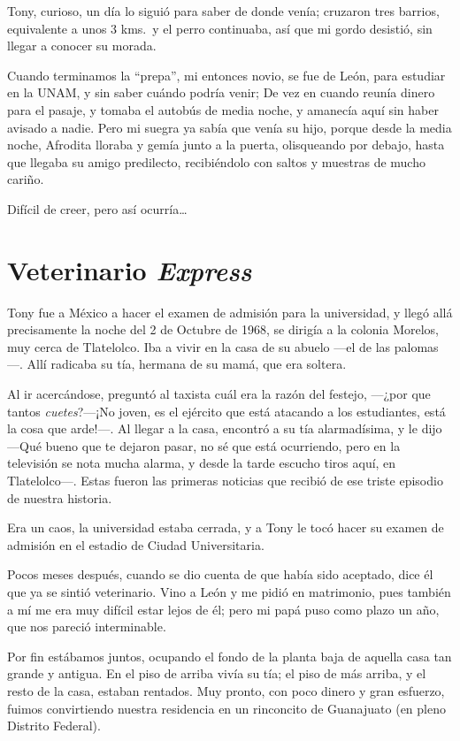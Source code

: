 \documentclass[letterpaper, 12pt]{book}
\begin{document}
Tony, curioso, un día lo siguió para saber de donde venía; cruzaron tres barrios, equivalente a unos 3 kms.\ y el perro continuaba, así que mi gordo desistió, sin llegar a conocer su morada.

Cuando terminamos la ``prepa'', mi entonces novio, se fue de León, para estudiar en la UNAM, y sin saber cuándo podría venir; De vez en cuando reunía dinero para el pasaje, y tomaba el autobús de media noche, y amanecía aquí sin haber avisado a nadie. Pero mi suegra ya sabía que venía su hijo, porque desde la media noche, Afrodita lloraba y gemía junto a la puerta, olisqueando por debajo, hasta que llegaba su amigo predilecto, recibiéndolo con saltos y muestras de mucho cariño.

Difícil de creer, pero así ocurría\ldots

\chapter{Veterinario \textit{Express}}
Tony fue a México a hacer el examen de admisión para la universidad, y llegó allá precisamente la noche del 2 de Octubre de 1968, se dirigía a la colonia Morelos, muy cerca de Tlatelolco. Iba a vivir en la casa de su abuelo ---el de las palomas---. Allí radicaba su tía, hermana de su mamá, que era soltera. 

Al ir acercándose, preguntó al taxista cuál era la razón del festejo, ---¿por que tantos \textit{cuetes}?---¡No joven, es el ejército que está atacando a los estudiantes, está la cosa que arde!---.
Al llegar a la casa, encontró a su tía alarmadísima, y le dijo ---Qué bueno que te dejaron pasar, no sé que está ocurriendo, pero en la televisión se nota mucha alarma, y desde la tarde escucho tiros aquí, en Tlatelolco---. Estas fueron las primeras noticias que recibió de ese triste episodio de nuestra historia. 

Era un caos, la universidad estaba cerrada, y a Tony le tocó hacer su examen de admisión en el estadio de Ciudad Universitaria. 

Pocos meses después, cuando se dio cuenta de que había sido aceptado, dice él que ya se sintió veterinario. Vino a León y me pidió en matrimonio, pues también a mí me era muy difícil estar lejos de él; pero mi papá puso como plazo un año, que nos pareció interminable.

Por fin estábamos juntos, ocupando el fondo de la planta baja de aquella casa tan grande y antigua. En el piso de arriba vivía su tía; el piso de más arriba, y el resto de la casa, estaban rentados. Muy pronto, con poco dinero y gran esfuerzo, fuimos convirtiendo nuestra residencia en un rinconcito de Guanajuato (en pleno Distrito Federal).
\end{document}
